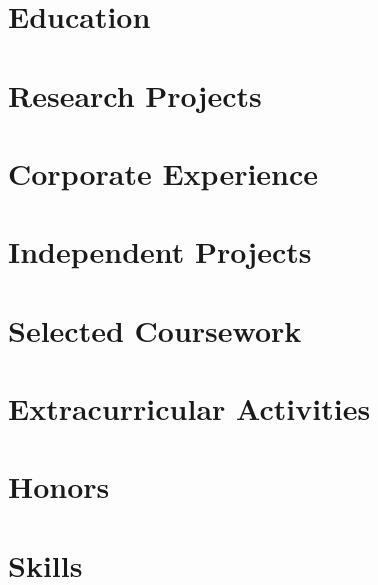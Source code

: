 \documentclass{prometheus_cv}
\begin{document}
\vspace*{-1cm}
\centering


\vspace*{0.4cm}
\section{Education}


\section{Research Projects}


\section{Corporate Experience}



\section{Independent Projects}



\section{Selected Coursework}



\section{Extracurricular Activities}



\section{Honors}



\section{Skills}

\end{document}
